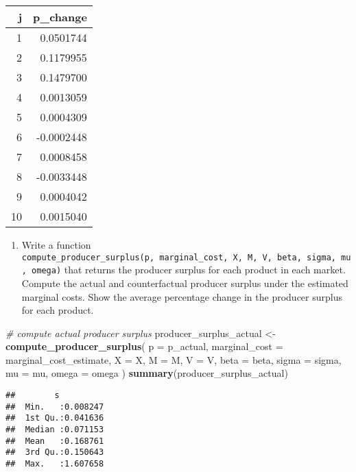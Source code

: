\documentclass[
]{book}
\newenvironment{Shaded}{\begin{snugshade}}{\end{snugshade}}
\newcommand{\AttributeTok}[1]{\textcolor[rgb]{0.13,0.29,0.53}{#1}}
\newcommand{\CommentTok}[1]{\textcolor[rgb]{0.56,0.35,0.01}{\textit{#1}}}
\newcommand{\FunctionTok}[1]{\textcolor[rgb]{0.13,0.29,0.53}{\textbf{#1}}}
\newcommand{\NormalTok}[1]{#1}
\newcommand{\OtherTok}[1]{\textcolor[rgb]{0.56,0.35,0.01}{#1}}
\providecommand{\tightlist}{%
  \setlength{\itemsep}{0pt}\setlength{\parskip}{0pt}}
\begin{document}
\begin{tabular}{r|r}
\hline
j & p\_change\\
\hline
1 & 0.0501744\\
\hline
2 & 0.1179955\\
\hline
3 & 0.1479700\\
\hline
4 & 0.0013059\\
\hline
5 & 0.0004309\\
\hline
6 & -0.0002448\\
\hline
7 & 0.0008458\\
\hline
8 & -0.0033448\\
\hline
9 & 0.0004042\\
\hline
10 & 0.0015040\\
\hline
\end{tabular}

\begin{enumerate}
\def\labelenumi{\arabic{enumi}.}
\setcounter{enumi}{2}
\tightlist
\item
  Write a function \texttt{compute\_producer\_surplus(p,\ marginal\_cost,\ X,\ M,\ V,\ beta,\ sigma,\ mu,\ omega)} that returns the producer surplus for each product in each market. Compute the actual and counterfactual producer surplus under the estimated marginal costs. Show the average percentage change in the producer surplus for each product.
\end{enumerate}

\begin{Shaded}
\begin{Highlighting}[]
\CommentTok{\# compute actual producer surplus}
\NormalTok{producer\_surplus\_actual }\OtherTok{\textless{}{-}}
  \FunctionTok{compute\_producer\_surplus}\NormalTok{(}
    \AttributeTok{p =}\NormalTok{ p\_actual, }
    \AttributeTok{marginal\_cost =}\NormalTok{ marginal\_cost\_estimate, }
    \AttributeTok{X =}\NormalTok{ X, }
    \AttributeTok{M =}\NormalTok{ M, }
    \AttributeTok{V =}\NormalTok{ V, }
    \AttributeTok{beta =}\NormalTok{ beta, }
    \AttributeTok{sigma =}\NormalTok{ sigma, }
    \AttributeTok{mu =}\NormalTok{ mu, }
    \AttributeTok{omega =}\NormalTok{ omega}
\NormalTok{    )}
\FunctionTok{summary}\NormalTok{(producer\_surplus\_actual)}
\end{Highlighting}
\end{Shaded}

\begin{verbatim}
##        s           
##  Min.   :0.008247  
##  1st Qu.:0.041636  
##  Median :0.071153  
##  Mean   :0.168761  
##  3rd Qu.:0.150643  
##  Max.   :1.607658
\end{verbatim}
\end{document}
